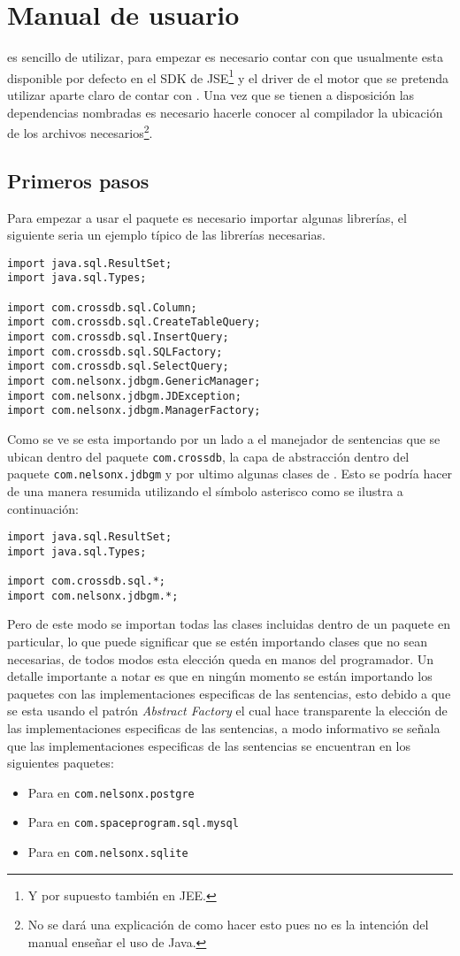 \chapter{Manual de usuario}
\jj es sencillo de utilizar, para empezar es necesario contar con \jd que usualmente esta disponible por defecto en el SDK de JSE\footnote{Y por supuesto también en JEE.} y el driver de el motor que se pretenda utilizar aparte claro de contar con \jj. Una vez que se tienen a disposición las dependencias nombradas es necesario hacerle conocer al compilador la ubicación de los archivos necesarios\footnote{No se dará una explicación de como hacer esto pues no es la intención del manual enseñar el uso de Java.}.
%
\section{Primeros pasos}
Para empezar a usar el paquete es necesario importar algunas librerías, el siguiente seria un ejemplo típico de las librerías necesarias.
%
\begin{lstlisting}[title=Librerías a importar]
import java.sql.ResultSet;
import java.sql.Types;

import com.crossdb.sql.Column;
import com.crossdb.sql.CreateTableQuery;
import com.crossdb.sql.InsertQuery;
import com.crossdb.sql.SQLFactory;
import com.crossdb.sql.SelectQuery;
import com.nelsonx.jdbgm.GenericManager;
import com.nelsonx.jdbgm.JDException;
import com.nelsonx.jdbgm.ManagerFactory;
\end{lstlisting}
%
Como se ve se esta importando por un lado a el manejador de sentencias que se ubican dentro del paquete \verb=com.crossdb=, la capa de abstracción dentro del paquete \verb=com.nelsonx.jdbgm= y por ultimo algunas clases de \jd. Esto se podría hacer de una manera resumida utilizando el símbolo asterisco como se ilustra a continuación:
%
\begin{lstlisting}[title=Librerías a importar forma resumida]
import java.sql.ResultSet;
import java.sql.Types;

import com.crossdb.sql.*;
import com.nelsonx.jdbgm.*;
\end{lstlisting}
%
Pero de este modo se importan todas las clases incluidas dentro de un paquete en particular, lo que puede significar que se estén importando clases que no sean necesarias, de todos modos esta elección queda en manos del programador. Un detalle importante a notar es que en ningún momento se están importando los paquetes con las implementaciones especificas de las sentencias, esto debido a que se esta usando el patrón \textit{Abstract Factory} el cual hace transparente la elección de las implementaciones especificas de las sentencias, a modo informativo se señala que las implementaciones especificas de las sentencias se encuentran en los siguientes paquetes:
%
\begin{itemize}
\item Para \p en \verb=com.nelsonx.postgre=
\item Para \m en \verb=com.spaceprogram.sql.mysql=
\item Para \s en \verb=com.nelsonx.sqlite=
\end{itemize} 

